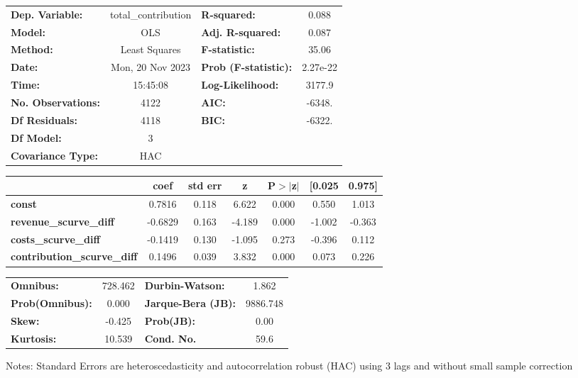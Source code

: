 \begin{center}
\begin{tabular}{lclc}
\toprule
\textbf{Dep. Variable:}             & total\_contribution & \textbf{  R-squared:         } &     0.088   \\
\textbf{Model:}                     &         OLS         & \textbf{  Adj. R-squared:    } &     0.087   \\
\textbf{Method:}                    &    Least Squares    & \textbf{  F-statistic:       } &     35.06   \\
\textbf{Date:}                      &   Mon, 20 Nov 2023  & \textbf{  Prob (F-statistic):} &  2.27e-22   \\
\textbf{Time:}                      &       15:45:08      & \textbf{  Log-Likelihood:    } &    3177.9   \\
\textbf{No. Observations:}          &          4122       & \textbf{  AIC:               } &    -6348.   \\
\textbf{Df Residuals:}              &          4118       & \textbf{  BIC:               } &    -6322.   \\
\textbf{Df Model:}                  &             3       & \textbf{                     } &             \\
\textbf{Covariance Type:}           &         HAC         & \textbf{                     } &             \\
\bottomrule
\end{tabular}
\begin{tabular}{lcccccc}
                                    & \textbf{coef} & \textbf{std err} & \textbf{z} & \textbf{P$> |$z$|$} & \textbf{[0.025} & \textbf{0.975]}  \\
\midrule
\textbf{const}                      &       0.7816  &        0.118     &     6.622  &         0.000        &        0.550    &        1.013     \\
\textbf{revenue\_scurve\_diff}      &      -0.6829  &        0.163     &    -4.189  &         0.000        &       -1.002    &       -0.363     \\
\textbf{costs\_scurve\_diff}        &      -0.1419  &        0.130     &    -1.095  &         0.273        &       -0.396    &        0.112     \\
\textbf{contribution\_scurve\_diff} &       0.1496  &        0.039     &     3.832  &         0.000        &        0.073    &        0.226     \\
\bottomrule
\end{tabular}
\begin{tabular}{lclc}
\textbf{Omnibus:}       & 728.462 & \textbf{  Durbin-Watson:     } &    1.862  \\
\textbf{Prob(Omnibus):} &   0.000 & \textbf{  Jarque-Bera (JB):  } & 9886.748  \\
\textbf{Skew:}          &  -0.425 & \textbf{  Prob(JB):          } &     0.00  \\
\textbf{Kurtosis:}      &  10.539 & \textbf{  Cond. No.          } &     59.6  \\
\bottomrule
\end{tabular}
\end{center}

Notes: \newline
 [1] Standard Errors are heteroscedasticity and autocorrelation robust (HAC) using 3 lags and without small sample correction